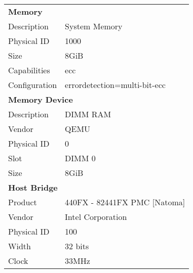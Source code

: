 \documentclass{article}
\begin{document}
\begin{table}[H]
\begin{tabular}{ll}
      \midrule
      \multicolumn{2}{l}{\textbf{Memory}} \\
      Description & System Memory \\
      Physical ID & 1000 \\
      Size & 8GiB \\
      Capabilities & ecc \\
      Configuration & errordetection=multi-bit-ecc \\
      \midrule
      \multicolumn{2}{l}{\textbf{Memory Device}} \\
      Description & DIMM RAM \\
      Vendor & QEMU \\
      Physical ID & 0 \\
      Slot & DIMM 0 \\
      Size & 8GiB \\
      \midrule
      \multicolumn{2}{l}{\textbf{Host Bridge}} \\
      Product & 440FX - 82441FX PMC [Natoma] \\
      Vendor & Intel Corporation \\
      Physical ID & 100 \\
      Width & 32 bits \\
      Clock & 33MHz \\
      \midrule
      \bottomrule
    \end{tabular}
  \end{table}
  \newpage
  
\end{document}
